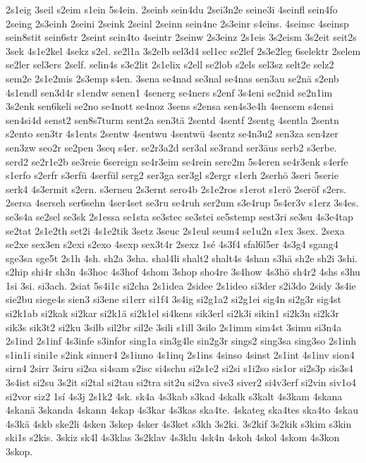 {2s1eig
3seil
s2eim
s1ein
5s4ein.
2seinb
sein4du
2sei3n2e
seine3i
4seinfl
sein4fo
2seing
2s3einh
2seini
2seink
2seinl
2seinn
sein4ne
2s3einr
s4eins.
4seinsc
4seinsp
sein8stit
sein6str
2seint
sein4to
4seintr
2seinw
2s3einz
2s1eis
3s2eism
3s2eit
seit2s
3sek
4s1e2kel
4sekz
s2el.
se2l1a
3s2elb
sel3d4
sel1ec
se2lef
2s3e2leg
6selektr
2selem
se2ler
sel3ers
2self.
selin4s
s3e2lit
2s1elix
s2ell
se2lob
s2els
sel3sz
selt2e
selz2
sem2e
2s1e2mis
2s3emp
s4en.
3sena
se4nad
se3nal
se4nas
sen3au
se2nä
s2enb
4s1endl
sen3d4r
s1endw
senen1
4senerg
se4ners
s2enf
3s4eni
se2nid
se2n1im
3s2enk
sen6keli
se2no
se4nott
se4noz
3sens
s2ensa
sen4s3e4h
4sensem
s4ensi
sen4si4d
senst2
sen8s7turm
sent2a
sen3tä
2sentd
4sentf
2sentg
4sentla
2sentn
s2ento
sen3tr
4s1ents
2sentw
4sentwu
4sentwü
4sentz
se4n3u2
sen3za
sen4zer
sen3zw
seo2r
se2pen
3seq
s4er.
se2r3a2d
ser3al
se3rand
ser3äus
serb2
s3erbe.
serd2
se2r1e2b
se3reie
6sereign
se4r3eim
se4rein
sere2m
5s4eren
se4r3enk
s4erfe
s1erfo
s2erfr
s3erfü
4serfül
serg2
ser3ga
ser3gl
s2ergr
s1erh
2serhö
3seri
5serie
serk4
4s3ermit
s2ern.
s3erneu
2s3ernt
sero4b
2s1e2ros
s1erot
s1erö
2seröf
s2ers.
2sersa
4serseh
ser6sehn
4ser4set
se3ru
se4ruh
ser2um
s3e4rup
5s4er3v
s1erz
3s4es.
se3s4a
se2sel
se3sk
2s1essa
se1sta
se3stec
se3stei
se5stemp
sest3ri
se3su
4s3e4tap
se2tat
2s1e2th
set2i
4s1e2tik
3setz
3seuc
2s1eul
seum4
se1u2n
s1ex
3sex.
2sexa
se2xe
sex3en
s2exi
s2exo
4sexp
sex3t4r
2sexz
1sé
4s3f4
sfal6l5er
4s3g4
sgang4
sge3sa
sge5t
2s1h
4sh.
sh2a
3sha.
shal4li
shalt2
shalt4s
4shan
s3hä
sh2e
sh2i
3shi.
s2hip
shi4r
sh3n
4s3hoc
4s3hof
4shom
3shop
sho4re
3s4how
4s3hö
sh4r2
4shs
s3hu
1si
3si.
si3ach.
2siat
5s4i1c
si2cha
2s1idea
2sidee
2s1ideo
si3der
s2i3do
2sidy
3s4ie
sie2bu
siege4s
sien3
si3ene
si1err
si1f4
3s4ig
si2g1a2
si2g1ei
sig4n
si2g3r
sig4st
si2k1ab
si2kak
si2kar
si2k1ä
si2k1el
si4kens
sik3erl
si2k3i
sikin1
si2k3n
si2k3r
sik3s
sik3t2
si2ku
3silb
sil2br
sil2e
3sili
s1ill
3silo
2s1imm
sim4st
3simu
si3n4a
2s1ind
2s1inf
4s3infe
s3infor
sing1a
sin3g4le
sin2g3r
sings2
sing3sa
sing3so
2s1inh
s1in1i
sini1e
s2ink
sinner4
2s1inno
4s1inq
2s1ins
4sinso
4sinst
2s1int
4s1inv
sion4
sirn4
2sirr
3siru
si2sa
si4sam
s2isc
si4schu
si2s1e2
si2si
s1i2so
sis1or
si2s3p
sis3s4
3s4ist
si2su
3s2it
si2tal
si2tau
si2tra
sit2u
si2va
sive3
siver2
si4v3erf
si2vin
siv1o4
si2vor
siz2
1sí
4s3j
2s1k2
4sk.
sk4a
4s3kab
s3kad
4skalk
s3kalt
4s3kam
4skana
4skanä
3skanda
4skann
4skap
4s3kar
4s3kas
ska4te.
4skateg
ska4tes
ska4to
4skau
4s3kä
4skb
ske2li
4sken
3skep
4sker
4s3ket
s3kh
3s2ki.
3s2kif
3s2kik
s3kim
s3kin
ski1s
s2kis.
3skiz
sk4l
4s3klas
3s2klav
4s3klu
4sk4n
4skoh
4skol
4skom
4s3kon
3skop.
}
